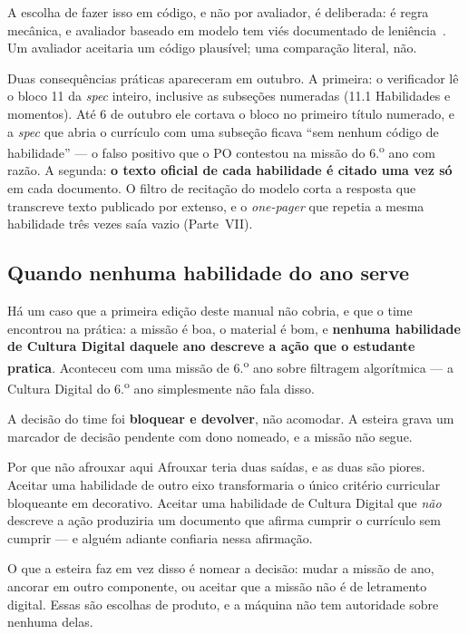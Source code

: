 \documentclass[11pt,a4paper]{article}
\newcommand{\cod}[1]{{\ttfamily\small #1}}
\begin{document}
A escolha de fazer isso em código, e não por avaliador, é deliberada: é regra mecânica, e avaliador baseado em modelo tem viés documentado de leniência~\cite{zheng2023}. Um avaliador aceitaria um código plausível; uma comparação literal, não.

Duas consequências práticas apareceram em outubro. A primeira: o verificador lê o bloco 11 da \emph{spec} inteiro, inclusive as subseções numeradas (\cod{11.1 Habilidades e momentos}). Até 6 de outubro ele cortava o bloco no primeiro título numerado, e a \emph{spec} que abria o currículo com uma subseção ficava ``sem nenhum código de habilidade'' --- o falso positivo que o PO contestou na missão do 6.\textsuperscript{o} ano com razão. A segunda: \textbf{o texto oficial de cada habilidade é citado uma vez só} em cada documento. O filtro de recitação do modelo corta a resposta que transcreve texto publicado por extenso, e o \emph{one-pager} que repetia a mesma habilidade três vezes saía vazio (Parte~VII).

\subsection{Quando nenhuma habilidade do ano serve}

Há um caso que a primeira edição deste manual não cobria, e que o time encontrou na prática: a missão é boa, o material é bom, e \textbf{nenhuma habilidade de Cultura Digital daquele ano descreve a ação que o estudante pratica}. Aconteceu com uma missão de 6.\textsuperscript{o} ano sobre filtragem algorítmica --- a Cultura Digital do 6.\textsuperscript{o} ano simplesmente não fala disso.

A decisão do time foi \textbf{bloquear e devolver}, não acomodar. A esteira grava um marcador de decisão pendente com dono nomeado, e a missão não segue.

\begin{caixaConceito}{Por que não afrouxar aqui}
Afrouxar teria duas saídas, e as duas são piores. Aceitar uma habilidade de outro eixo transformaria o único critério curricular bloqueante em decorativo. Aceitar uma habilidade de Cultura Digital que \emph{não} descreve a ação produziria um documento que afirma cumprir o currículo sem cumprir --- e alguém adiante confiaria nessa afirmação.

O que a esteira faz em vez disso é nomear a decisão: mudar a missão de ano, ancorar em outro componente, ou aceitar que a missão não é de letramento digital. Essas são escolhas de produto, e a máquina não tem autoridade sobre nenhuma delas.
\end{caixaConceito}
\end{document}
